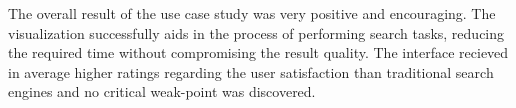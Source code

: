 The overall result of the use case study was very positive and encouraging. The visualization successfully aids in the process of performing search tasks, reducing the required time without compromising the result quality. The interface recieved in average higher ratings regarding the user satisfaction than traditional search engines and no critical weak-point was discovered.